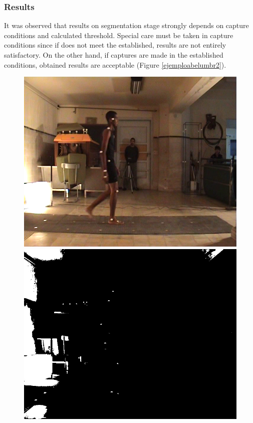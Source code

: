 \subsubsection{Results}
It was observed that results on segmentation stage strongly depends on capture conditions and calculated threshold. Special care must be taken in capture conditions since if does not meet the established, results are not entirely satisfactory.
On the other hand, if captures are made in the established conditions, obtained results are acceptable (Figure \ref{ejemploabelumbr2}).
\vspace{-0.5cm}
\begin{figure}[ht!]
      \centering
        {\includegraphics[scale=0.10]{imagenes/abel_original_video.png}\label{abelvideo}}\hspace{1 mm}
        {\includegraphics[scale=0.10]{imagenes/abel_original_filtro.png}\label{abelfiltro}}

\end{figure}
